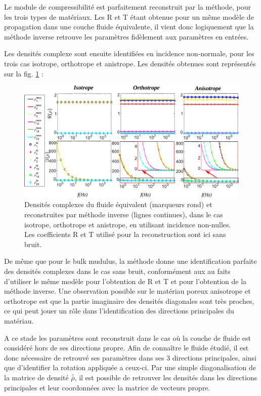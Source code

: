 \documentclass[twoside,openright]{report}
\begin{document}
    Le module de compressibilité est parfaitement reconstruit par la méthode, pour les trois types de matériaux. Les R et T étant obtenue pour un même modèle de propagation dans une couche fluide équivalente, il vient donc logiquement que la méthode inverse retrouve les paramètres fidèlement aux paramètres en entrées. 
    
    Les densités complexe sont ensuite identifiées en incidence non-normale, pour les trois cas isotrope, orthotrope et anistrope. Les densités obtenues sont représentés sur la fig. \ref{rho_rot} :
    \begin{figure}[ht!]
        \centering
        \includegraphics[scale=0.45]{Density_rot.pdf}
        \caption{Densités complexes du fluide équivalent (marqueurs rond) et reconstruites par méthode inverse  (lignes continues), dans le cas isotrope, orthotrope et anistrope, en utilisant  incidence non-nulles. Les coefficients R et T utilisé pour la reconstruction sont ici sans bruit.}
        \label{rho_rot}
    \end{figure}
    
    De même que pour le bulk mudulus, la méthode donne une identification parfaite des densités complexes dans le cas sans bruit, conformément aux au faits d'utiliser le même modèle pour l'obtention de R et T et pour l'obtention de la méthode inverse. Une observation possible sur le matériau poreux anisotrope et orthotrope est que la partie imaginaire des densités diagonales sont très proches, ce qui peut jouer un rôle dans l'identification des directions principales du matériau.
    
    A ce stade les paramètres sont reconstruit dans le cas où la couche de fluide est considéré hors de ses directions propre. Afin de connaître le fluide étudié, il est donc nécessaire de retrouvé ses paramètres dans ses 3 directions principales, ainsi que d'identifier la rotation appliquée a ceux-ci.    
    Par une simple diagonalisation de la matrice de densité $\bar{\bar{\rho}}$, il est possible de retrouver les densités dans les directions principales et leur coordonnées avec la matrice de vecteurs propre.
    
\end{document}
